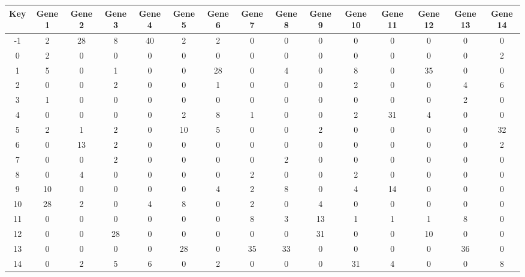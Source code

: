 \begin{tabular}{|c|c|c|c|c|c|c|c|c|c|c|c|c|c|c|}
\hline
Key & Gene 1 & Gene 2 & Gene 3 & Gene 4 & Gene 5 & Gene 6 & Gene 7 & Gene 8 & Gene 9 & Gene 10 & Gene 11 & Gene 12 & Gene 13 & Gene 14 \\
\hline
-1 & 2 & 28 & 8 & 40 & 2 & 2 & 0 & 0 & 0 & 0 & 0 & 0 & 0 & 0 \\
0 & 2 & 0 & 0 & 0 & 0 & 0 & 0 & 0 & 0 & 0 & 0 & 0 & 0 & 2 \\
1 & 5 & 0 & 1 & 0 & 0 & 28 & 0 & 4 & 0 & 8 & 0 & 35 & 0 & 0 \\
2 & 0 & 0 & 2 & 0 & 0 & 1 & 0 & 0 & 0 & 2 & 0 & 0 & 4 & 6 \\
3 & 1 & 0 & 0 & 0 & 0 & 0 & 0 & 0 & 0 & 0 & 0 & 0 & 2 & 0 \\
4 & 0 & 0 & 0 & 0 & 2 & 8 & 1 & 0 & 0 & 2 & 31 & 4 & 0 & 0 \\
5 & 2 & 1 & 2 & 0 & 10 & 5 & 0 & 0 & 2 & 0 & 0 & 0 & 0 & 32 \\
6 & 0 & 13 & 2 & 0 & 0 & 0 & 0 & 0 & 0 & 0 & 0 & 0 & 0 & 2 \\
7 & 0 & 0 & 2 & 0 & 0 & 0 & 0 & 2 & 0 & 0 & 0 & 0 & 0 & 0 \\
8 & 0 & 4 & 0 & 0 & 0 & 0 & 2 & 0 & 0 & 2 & 0 & 0 & 0 & 0 \\
9 & 10 & 0 & 0 & 0 & 0 & 4 & 2 & 8 & 0 & 4 & 14 & 0 & 0 & 0 \\
10 & 28 & 2 & 0 & 4 & 8 & 0 & 2 & 0 & 4 & 0 & 0 & 0 & 0 & 0 \\
11 & 0 & 0 & 0 & 0 & 0 & 0 & 8 & 3 & 13 & 1 & 1 & 1 & 8 & 0 \\
12 & 0 & 0 & 28 & 0 & 0 & 0 & 0 & 0 & 31 & 0 & 0 & 10 & 0 & 0 \\
13 & 0 & 0 & 0 & 0 & 28 & 0 & 35 & 33 & 0 & 0 & 0 & 0 & 36 & 0 \\
14 & 0 & 2 & 5 & 6 & 0 & 2 & 0 & 0 & 0 & 31 & 4 & 0 & 0 & 8 \\
\hline
\end{tabular}